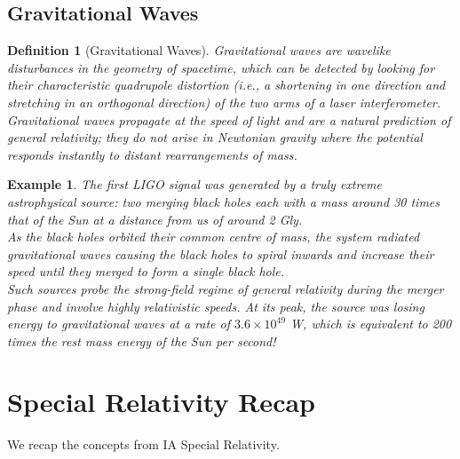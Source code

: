 \documentclass[a4paper]{article}
\newtheorem{eg}{Example}[section]
\theoremstyle{new}
\newtheorem{defi}{Definition}[section]
\begin{document}
\subsection{Gravitational Waves}
\begin{defi}[Gravitational Waves]
Gravitational waves are wavelike disturbances in the geometry of spacetime, which can be detected by looking for their characteristic quadrupole distortion (i.e., a shortening in one direction and stretching in an orthogonal direction) of the two arms of a laser interferometer.\\[5pt]
Gravitational waves propagate at the speed of light and are a natural prediction of general relativity; they do not arise in Newtonian gravity where the potential responds instantly to distant rearrangements of mass.
\end{defi}
\begin{eg}
The first LIGO signal was generated by a truly extreme astrophysical source: two merging black holes each with a mass around 30 times that of the Sun at a distance from us of around 2 Gly.\\[5pt]
As the black holes orbited their common centre of mass, the system radiated gravitational waves causing the black holes to spiral inwards and increase their speed until they merged to form a single black hole.\\[5pt]
Such sources probe the strong-field regime of general relativity during the merger phase and involve highly relativistic speeds. At its peak, the source was losing energy to gravitational waves at a rate of $3.6\times10^{49}$ W, which is equivalent to 200 times the rest mass energy of the Sun per second!
\end{eg}
\newpage
\section{Special Relativity Recap}
We recap the concepts from IA Special Relativity.
\end{document}
